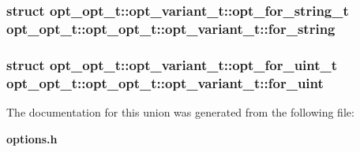 \subsubsection[{for\_\-string}]{\setlength{\rightskip}{0pt plus 5cm}struct {\bf opt\_\-opt\_\-t::opt\_\-variant\_\-t::opt\_\-for\_\-string\_\-t}  opt\_\-opt\_\-t::opt\_\-opt\_\-t::opt\_\-variant\_\-t::for\_\-string}\label{unionopt__opt__t_1_1opt__variant__t_3b5ed13b79ee9487995c4ede85c2a6aa}


\subsubsection[{for\_\-uint}]{\setlength{\rightskip}{0pt plus 5cm}struct {\bf opt\_\-opt\_\-t::opt\_\-variant\_\-t::opt\_\-for\_\-uint\_\-t}  opt\_\-opt\_\-t::opt\_\-opt\_\-t::opt\_\-variant\_\-t::for\_\-uint}\label{unionopt__opt__t_1_1opt__variant__t_3cabdf619e0202b516b100f189d5a8e3}




The documentation for this union was generated from the following file:\begin{CompactItemize}
\item 
{\bf options.h}\end{CompactItemize}
